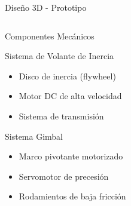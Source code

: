 \documentclass[10pt,xcolor={dvipsnames}]{beamer}
\begin{document}
\begin{frame}{Diseño 3D - Prototipo}
\begin{center}
\end{center}

\vspace{0.3cm}
\begin{columns}

\end{columns}
\end{frame}

\begin{frame}{Componentes Mecánicos}
\begin{block}{Sistema de Volante de Inercia}
\begin{itemize}
    \item Disco de inercia (flywheel)
    \item Motor DC de alta velocidad
    \item Sistema de transmisión
\end{itemize}
\end{block}

\begin{block}{Sistema Gimbal}
\begin{itemize}
    \item Marco pivotante motorizado
    \item Servomotor de precesión
    \item Rodamientos de baja fricción
\end{itemize}
\end{block}

\vspace{0.3cm}
\begin{center}
\end{center}
\end{frame}
\end{document}
